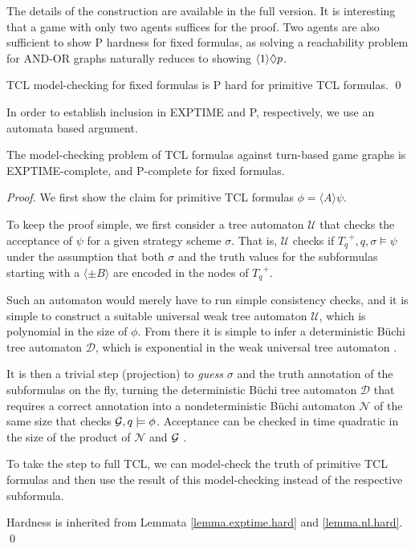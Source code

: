 The details of the construction are available in the full version. 
It is interesting that a game with only two agents suffices for the proof.  
Two agents are also sufficient to show P hardness for fixed formulas, as solving a reachability problem for AND-OR graphs \cite{Immerman81} naturally reduces to showing $\langle 1 \rangle \Diamond p$.

\begin{lemma}
\label{lemma.nl.hard}
TCL model-checking for fixed formulas is P hard for primitive TCL formulas.
\qed 
\end{lemma}

In order to establish inclusion in EXPTIME and P, respectively, we use an automata based argument.

\begin{theorem}
\label{theo.ms.complete}
The model-checking problem of TCL formulas against turn-based game graphs
is EXPTIME-complete, and P-complete for fixed formulas.
\end{theorem}

\begin{proof}
We first show the claim for primitive TCL formulas $\phi=\langle A \rangle \psi$.
 
To keep the proof simple, we first consider a tree automaton $\mathcal U$ that checks the acceptance of $\psi$ for a given strategy scheme $\sigma$.
That is, $\mathcal U$ checks if ${T_q}^+,q,\sigma \models \psi$ under the assumption that both $\sigma$ and the truth values for the subformulas starting with a $\langle \pm B \rangle$ are encoded in the nodes of ${T_q}^+$.

Such an automaton would merely have to run simple consistency checks, and it is simple to construct a suitable universal weak tree automaton $\mathcal U$, which is polynomial in the size of $\phi$.
From there it is simple to infer a deterministic B\"uchi tree automaton 
$\mathcal D$, which is exponential in the weak universal tree automaton 
\cite{Muller+Schupp/95/Alternating}.

It is then a trivial step (projection) to \emph{guess} $\sigma$ and the truth annotation of the subformulas on the fly, turning the deterministic B\"uchi tree automaton $\mathcal D$ that requires a correct annotation into a nondeterministic B\"uchi automaton $\mathcal N$ of the same size that checks ${\cal G},q \models \phi$.
%
Acceptance can be checked in time quadratic in the size of the product of $\mathcal N$ and ${\cal G}$ \cite{Chatterjee+Henzinger/12/Buchi}.

To take the step to full TCL, we can model-check the truth of primitive TCL formulas and then use the result of this model-checking instead of the respective subformula.

Hardness is inherited from Lemmata \ref{lemma.exptime.hard} and \ref{lemma.nl.hard}.
\qed
\end{proof}

